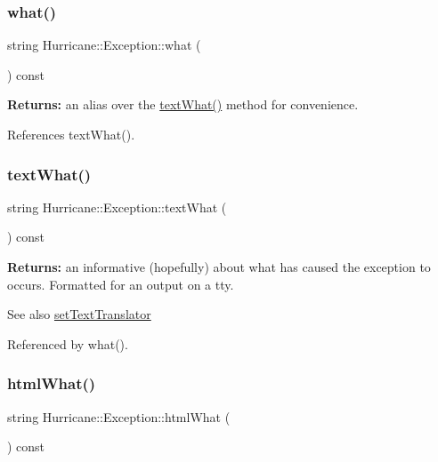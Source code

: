 \subsubsection{\texorpdfstring{what()}{what()}}
{\footnotesize\ttfamily string Hurricane\+::\+Exception\+::what (\begin{DoxyParamCaption}{ }\end{DoxyParamCaption}) const\hspace{0.3cm}{\ttfamily [inline]}}

{\bfseries Returns\+:} an alias over the \mbox{\hyperlink{classHurricane_1_1Exception_a19b5d24e8f02bb99625a5206638c44e8}{text\+What()}} method for convenience. 

References text\+What().

\mbox{\label{classHurricane_1_1Exception_a19b5d24e8f02bb99625a5206638c44e8}} 
\subsubsection{\texorpdfstring{text\+What()}{textWhat()}}
{\footnotesize\ttfamily string Hurricane\+::\+Exception\+::text\+What (\begin{DoxyParamCaption}{ }\end{DoxyParamCaption}) const\hspace{0.3cm}{\ttfamily [inline]}}

{\bfseries Returns\+:} an informative (hopefully) about what has caused the exception to occurs. Formatted for an output on a tty.

\begin{DoxySeeAlso}{See also}
\mbox{\hyperlink{classHurricane_1_1Exception_a1a57fbbc4b57a014558ba31d18ec9b62}{set\+Text\+Translator}} 
\end{DoxySeeAlso}


Referenced by what().

\mbox{\label{classHurricane_1_1Exception_a2582e6c3acb236e24f48cb873f64e3e9}} 
\subsubsection{\texorpdfstring{html\+What()}{htmlWhat()}}
{\footnotesize\ttfamily string Hurricane\+::\+Exception\+::html\+What (\begin{DoxyParamCaption}{ }\end{DoxyParamCaption}) const\hspace{0.3cm}{\ttfamily [inline]}}

